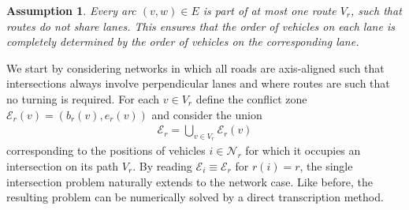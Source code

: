 \documentclass[a4paper]{article}
\theoremstyle{definition}
\theoremstyle{plain}
\newtheorem{assump}{Assumption\hspace{0.25em}\ignorespaces}
\begin{document}
\begin{assump}\label{assump:disjoint_routes}
  Every arc $(v,w) \in E$ is part of at most one route $V_{r}$, such that routes
  do not share lanes. This ensures that the order of vehicles on each lane is
  completely determined by the order of vehicles on the corresponding lane.
\end{assump}

We start by considering networks in which all roads are axis-aligned such that
intersections always involve perpendicular lanes and where routes are such that
no turning is required. For each $v \in V_{r}$ define the conflict zone
$\mathcal{E}_{r}(v) = (b_{r}(v), e_{r}(v))$ and consider the union
\begin{align*}
  \mathcal{E}_{r} = \bigcup_{v \in V_{r}} \mathcal{E}_{r}(v)
\end{align*}
corresponding to the positions of vehicles $i \in \mathcal{N}_{r}$ for which it
occupies an intersection on its path $V_{r}$.
%
By reading $\mathcal{E}_{i} \equiv \mathcal{E}_{r}$ for $r(i) = r$, the single
intersection problem naturally extends to the network case. Like before, the
resulting problem can be numerically solved by a direct transcription method.
\end{document}
